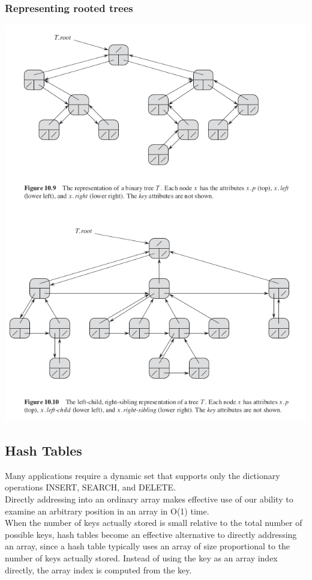 \documentclass[11pt]{article}
\begin{document}
\subsubsection{Representing rooted trees}
\label{sec-4-1-3}

\includegraphics[width=.9\linewidth]{pics/c10_rooted_tree.png} \\

\subsection{Hash Tables}
\label{sec-4-2}
Many applications require a dynamic set that supports only the dictionary operations INSERT, SEARCH, and DELETE. \\

Directly addressing into an ordinary array makes effective use of our ability to examine an arbitrary position in an array in O(1) time. \\

When the number of keys actually stored is small relative to the total number of possible keys, hash tables become an effective alternative to directly addressing an array, since a hash table typically uses an array of size proportional to the number of keys actually stored. Instead of using the key as an array index directly, the array index is computed from the key. \\
\end{document}
